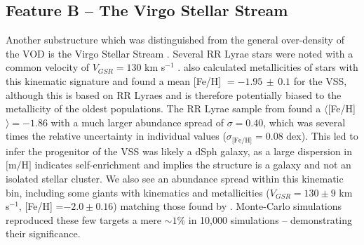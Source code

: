 \documentclass[preprint2]{aastex}
\begin{document}

	\subsection{Feature B \--- The Virgo Stellar Stream}
	\label{sec:the-vss}
	
	Another substructure which was distinguished from the general over-density of the VOD is the Virgo Stellar Stream \citep{Duffau;et-al_2006}. Several RR Lyrae stars were noted with a common velocity of $V_{GSR} = 130$ km s$^{-1}$ \citep{Newberg;et-al_2007, Prior;et-al_2009a}. \citet{Prior;et-al_2009a} also calculated metallicities of stars with this kinematic signature and found a mean [Fe/H] $= -1.95\,\pm\,0.1$ for the VSS, although this is based on RR Lyraes and is therefore potentially biased to the metallicity of the oldest populations. The RR Lyrae sample from \citet{Duffau;et-al_2006} found a $\langle$[Fe/H]$\rangle = -1.86$ with a much larger abundance spread of $\sigma = 0.40$, which was several times the relative uncertainty in individual values ($\sigma_{\mbox{[Fe/H]}} = 0.08$ dex). This led \citet{Duffau;et-al_2006} to infer the progenitor of the VSS was likely a dSph galaxy, as a large dispersion in $\mbox{[m/H]}$ indicates self-enrichment and implies the structure is a galaxy and not an isolated stellar cluster. We  also see an abundance spread within this kinematic bin, including some giants with kinematics and metallicities ($V_{GSR} = 130 \pm 9$ km s$^{-1}$, [Fe/H] =$ -2.0 \pm 0.16$) matching those found by \citet{Prior;et-al_2009a}. Monte-Carlo simulations reproduced these few targets a mere $\sim1$\% in 10,000 simulations \--- demonstrating their significance.
	
\end{document}

